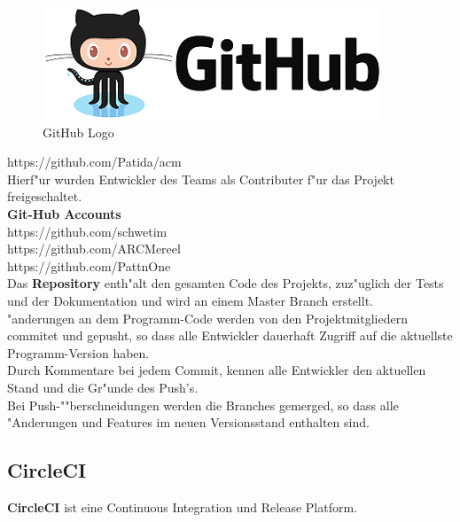 \documentclass[a4paper, 11pt]{scrreprt}
\begin{document}
\begin{figure} [H]
\begin{center}
\includegraphics[scale=0.7]{github.png}
\caption{GitHub Logo}
\label{github}
\end{center}
\end{figure}

https://github.com/Patida/acm \\

Hierf"ur wurden Entwickler des Teams als Contributer f"ur das Projekt freigeschaltet. \\

\textbf{Git-Hub Accounts} \\
https://github.com/schwetim \\
https://github.com/ARCMereel \\
https://github.com/PattnOne \\


Das \textbf{Repository} enth"alt den gesamten Code des Projekts, zuz"uglich der Tests und der Dokumentation und wird an einem Master Branch erstellt. \\
"anderungen an dem Programm-Code werden von den Projektmitgliedern commitet und gepusht, so dass alle Entwickler dauerhaft Zugriff auf die aktuellste Programm-Version haben. \\

Durch Kommentare bei jedem Commit, kennen alle Entwickler den aktuellen Stand und die Gr"unde des Push’s.  \\
Bei Push-""berschneidungen werden die Branches gemerged, so dass alle "Anderungen und Features im neuen Versionsstand enthalten sind. \\


\subsection{CircleCI}
\textbf{CircleCI} ist eine Continuous Integration und Release Platform. \\
\end{document}
